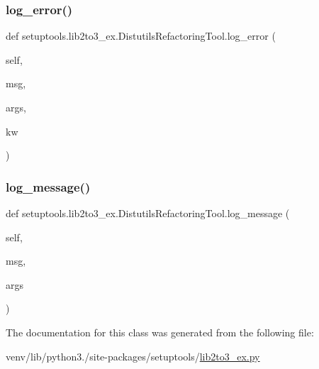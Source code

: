 \subsubsection{\texorpdfstring{log\+\_\+error()}{log\_error()}}
{\footnotesize\ttfamily def setuptools.\+lib2to3\+\_\+ex.\+Distutils\+Refactoring\+Tool.\+log\+\_\+error (\begin{DoxyParamCaption}\item[{}]{self,  }\item[{}]{msg,  }\item[{}]{args,  }\item[{}]{kw }\end{DoxyParamCaption})}

\mbox{\label{classsetuptools_1_1lib2to3__ex_1_1DistutilsRefactoringTool_abd4e41a1094e843d498e86b9a48e4872}} 
\subsubsection{\texorpdfstring{log\+\_\+message()}{log\_message()}}
{\footnotesize\ttfamily def setuptools.\+lib2to3\+\_\+ex.\+Distutils\+Refactoring\+Tool.\+log\+\_\+message (\begin{DoxyParamCaption}\item[{}]{self,  }\item[{}]{msg,  }\item[{}]{args }\end{DoxyParamCaption})}



The documentation for this class was generated from the following file\+:\begin{DoxyCompactItemize}
\item 
venv/lib/python3./site-\/packages/setuptools/\hyperlink{lib2to3__ex_8py}{lib2to3\+\_\+ex.\+py}\end{DoxyCompactItemize}
